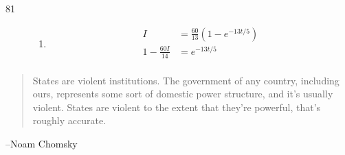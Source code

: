 \documentclass{exam}
\begin{document}
\begin{description}
      \item[81]
        \begin{enumerate}[a]
          \item 
            \begin{align*}
              I &= \frac{60}{13}\left( 1 - e^{-13t/5} \right) \\
              1 - \frac{60 I}{14} &= e^{-13t/5} \\
            \end{align*}

        \end{enumerate}

    \end{description}

  \else
    \vspace{6 cm}
    \begin{quote}
      \begin{em}
        States are violent institutions. The government of any country, including ours, represents some sort of domestic
        power structure, and it's usually violent. States are violent to the extent that they're powerful, that's
        roughly accurate.


      \end{em}
    \end{quote}
    \hspace{1 cm} --Noam Chomsky 
  \fi
\end{document}

